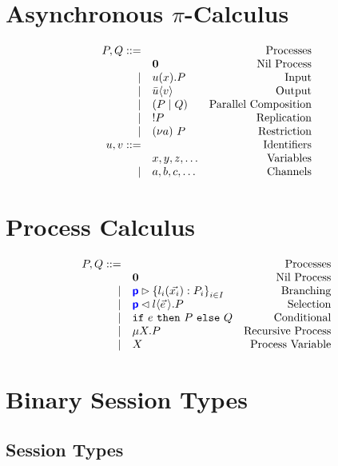 \documentclass{article}
\begin{document}
\clearpage

\appendix

\section{Asynchronous $\pi$-Calculus}
\doublespacing
\[
\begin{array}{rlr}
    P, Q ::= & & \text{Processes} \\
     & \mathbf{0} & \text{Nil Process} \\
		\mid & {u}({x}).P & \text{Input} \\
		\mid & \bar{u}\langle {v} \rangle & \text{Output} \\
		\mid & \left({P}\mid{Q}\right) & \text{Parallel Composition} \\
		\mid & !{P} & \text{Replication} \\
		\mid & (\nu{a})~{P} & \text{Restriction} \\
    u, v ::= & & \text{Identifiers} \\
     & x, y, z, \dots & \text{Variables} \\
		\mid & a, b, c, \dots & \text{Channels} \\
\end{array}
\]
\singlespacing

\section{Process Calculus}

\doublespacing
\[
\begin{array}{rlr}
    P, Q ::= & & \text{Processes} \\
     & \mathbf{0} & \text{Nil Process} \\
		\mid & {\color{blue}\bm{\mathsf{p}}} \rhd \left\{ {l_i(\vec{x_i}): P_i} \right\}_{i \in I} & \text{Branching} \\
		\mid & {\color{blue}\bm{\mathsf{p}}} \lhd {l \langle \vec{e}\,\rangle. P} & \text{Selection} \\
		\mid & \texttt{if}~{e}~\texttt{then}~{P}~\texttt{else}~{Q} & \text{Conditional} \\
		\mid & \mu X.{P} & \text{Recursive Process} \\
		\mid & X & \text{Process Variable} \\
\end{array}
\]
\singlespacing

\section{Binary Session Types}

\subsection{Session Types}
\end{document}
